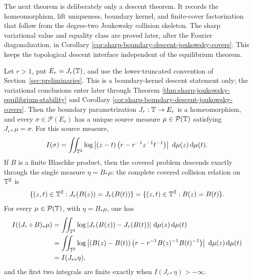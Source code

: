 The next theorem is deliberately only a descent theorem.  It records the
homeomorphism, lift uniqueness, boundary kernel, and finite-cover
factorization that follow from the degree-two Joukowsky collision
skeleton.  The sharp variational value and equality class are proved
later, after the Fourier diagonalization, in Corollary
\ref{cor:sharp-boundary-descent-joukowsky-covers}.  This keeps the
topological descent interface independent of the equilibrium theorem.

\begin{theorem}\label{thm:exact-boundary-descent-joukowsky-covers}
Let \(r>1\), put \(E_r=J_r(\mathbb{T})\), and use the lower-truncated convention of Section~\ref{sec:preliminaries}.  This is a boundary-kernel descent statement only; the variational conclusions enter later through Theorem \ref{thm:sharp-joukowsky-equilibrium-stability} and Corollary \ref{cor:sharp-boundary-descent-joukowsky-covers}.  Then the boundary parametrization \(J_r:\mathbb{T}\to E_r\) is a homeomorphism, and every \(\sigma\in\mathcal P(E_r)\) has a unique source measure \(\mu\in\mathcal P(\mathbb{T})\) satisfying \(J_{r\ast}\mu=\sigma\).  For this source measure,
\[
I(\sigma)=\iint_{\mathbb{T}^2}\log\left|(z-t)\left(r-r^{-1}z^{-1}t^{-1}\right)\right|\,\,\mathrm{d}\mu(z)\,\mathrm{d}\mu(t).
\]
If \(B\) is a finite Blaschke product, then the covered problem descends exactly through the single measure \(\eta=B_\ast\mu\): the complete covered collision relation on \(\mathbb{T}^2\) is
\[
\{(z,t)\in\mathbb{T}^2:J_r(B(z))=J_r(B(t))\}
=
\{(z,t)\in\mathbb{T}^2:B(z)=B(t)\}.
\]
For every \(\mu\in\mathcal P(\mathbb{T})\), with \(\eta=B_\ast\mu\), one has
\[
\begin{aligned}
I((J_r\circ B)_\ast\mu)
&=\iint_{\mathbb{T}^2}\log|J_r(B(z))-J_r(B(t))|\,\,\mathrm{d}\mu(z)\,\mathrm{d}\mu(t)\\
&=\iint_{\mathbb{T}^2}\log\left|(B(z)-B(t))
\left(r-r^{-1}B(z)^{-1}B(t)^{-1}\right)\right|\,\,\mathrm{d}\mu(z)\,\mathrm{d}\mu(t)\\
&=I(J_{r\ast}\eta),
\end{aligned}
\]
and the first two integrals are finite exactly when \(I(J_{r\ast}\eta)>-\infty\).
\end{theorem}

